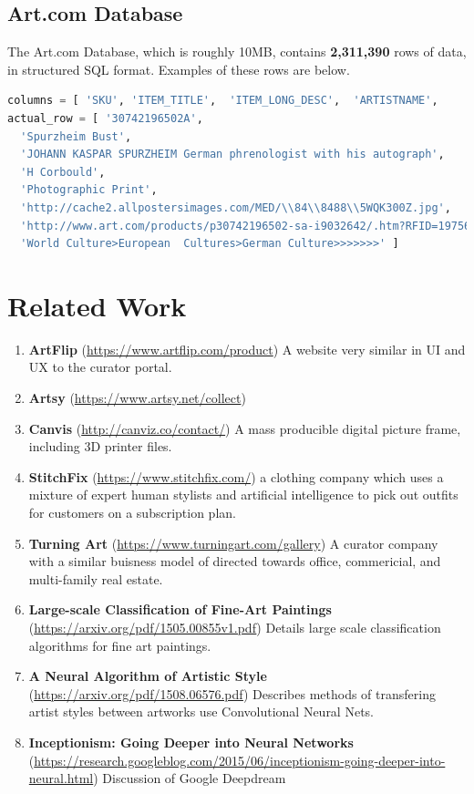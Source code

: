 \documentclass[fontsize=12pt]{scrartcl} %
\numberwithin{equation}{section} %
\numberwithin{figure}{section} %
\numberwithin{table}{section} %
\begin{document}
\subsection{Art.com Database}
The Art.com Database, which is roughly 10MB, contains \textbf{2,311,390} rows of data, in structured SQL format. Examples of these rows are below.\\

\begin{lstlisting}[language=Python]
columns = [ 'SKU', 'ITEM_TITLE',  'ITEM_LONG_DESC',  'ARTISTNAME',    'ITEM_TYPE',  'IMAGE_URL',  'PRODUCT_URL', 'PRODUCT_TAXONOMY' ]
actual_row = [ '30742196502A',
  'Spurzheim Bust',
  'JOHANN KASPAR SPURZHEIM German phrenologist with his autograph',
  'H Corbould',
  'Photographic Print',
  'http://cache2.allpostersimages.com/MED/\\84\\8488\\5WQK300Z.jpg',
  'http://www.art.com/products/p30742196502-sa-i9032642/.htm?RFID=197560',
  'World Culture>European  Cultures>German Culture>>>>>>>' ]
\end{lstlisting}

\section{Related Work}
\begin{enumerate}
    \item\textbf{ArtFlip} (\url{https://www.artflip.com/product}) A website very similar in UI and UX to the curator portal.
    \item\textbf{Artsy}  (\url{https://www.artsy.net/collect})
    \item\textbf{Canvis} (\url{http://canviz.co/contact/})  A mass producible digital picture frame, including 3D printer files.
    \item\textbf{StitchFix} (\url{https://www.stitchfix.com/})  a clothing company which uses a mixture of expert human stylists and artificial intelligence to pick out outfits for customers on a subscription plan.
    \item\textbf{Turning Art} (\url{https://www.turningart.com/gallery}) A curator company with a similar buisness model of directed towards office, commericial, and multi-family real estate.
    \item\textbf{Large-scale Classification of Fine-Art Paintings} (\url{https://arxiv.org/pdf/1505.00855v1.pdf}) Details large scale classification algorithms for fine art paintings.
    \item\textbf{A Neural Algorithm of Artistic Style} (\url{https://arxiv.org/pdf/1508.06576.pdf}) Describes methods of transfering artist styles between artworks use Convolutional Neural Nets.
    \item\textbf{Inceptionism: Going Deeper into Neural Networks} (\url{https://research.googleblog.com/2015/06/inceptionism-going-deeper-into-neural.html}) Discussion of Google Deepdream
\end{enumerate}
\end{document}
